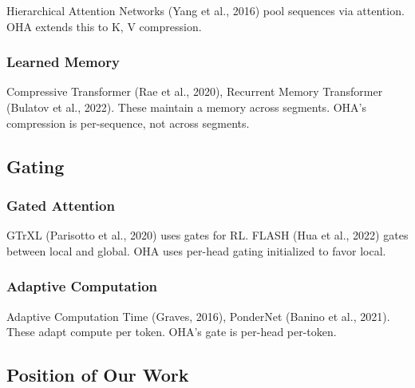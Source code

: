 Hierarchical Attention Networks (Yang et al., 2016) pool sequences via 
attention. OHA extends this to K, V compression.

\subsubsection{Learned Memory}

Compressive Transformer (Rae et al., 2020), Recurrent Memory Transformer 
(Bulatov et al., 2022). These maintain a memory across segments. OHA's 
compression is per-sequence, not across segments.

\subsection{Gating}

\subsubsection{Gated Attention}

GTrXL (Parisotto et al., 2020) uses gates for RL. FLASH (Hua et al., 2022) 
gates between local and global. OHA uses per-head gating initialized to 
favor local.

\subsubsection{Adaptive Computation}

Adaptive Computation Time (Graves, 2016), PonderNet (Banino et al., 2021). 
These adapt compute per token. OHA's gate is per-head per-token.

\subsection{Position of Our Work}

